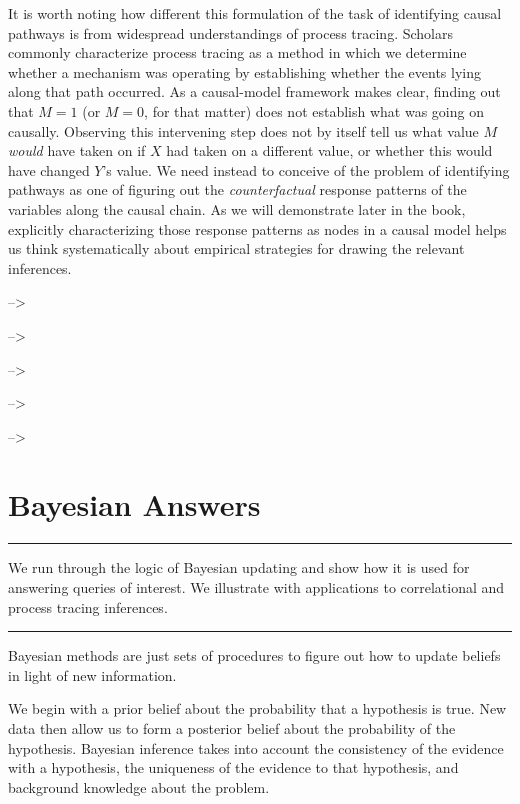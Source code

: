 \documentclass[
  12pt,
]{book}
\begin{document}
It is worth noting how different this formulation of the task of identifying causal pathways is from widespread understandings of process tracing. Scholars commonly characterize process tracing as a method in which we determine whether a mechanism was operating by establishing whether the events lying along that path occurred. As a causal-model framework makes clear, finding out that \(M=1\) (or \(M=0\), for that matter) does not establish what was going on causally. Observing this intervening step does not by itself tell us what value \(M\) \emph{would} have taken on if \(X\) had taken on a different value, or whether this would have changed \(Y\)'s value. We need instead to conceive of the problem of identifying pathways as one of figuring out the \emph{counterfactual} response patterns of the variables along the causal chain. As we will demonstrate later in the book, explicitly characterizing those response patterns as nodes in a causal model helps us think systematically about empirical strategies for drawing the relevant inferences.

--\textgreater{}

--\textgreater{}

--\textgreater{}

--\textgreater{}

--\textgreater{}

\hypertarget{bayeschapter}{%
\chapter{Bayesian Answers}\label{bayeschapter}}

\begin{center}\rule{0.5\linewidth}{0.5pt}\end{center}

We run through the logic of Bayesian updating and show how it is used for answering queries of interest. We illustrate with applications to correlational and process tracing inferences.

\begin{center}\rule{0.5\linewidth}{0.5pt}\end{center}

Bayesian methods are just sets of procedures to figure out how to update beliefs in light of new information.

We begin with a prior belief about the probability that a hypothesis is true. New data then allow us to form a posterior belief about the probability of the hypothesis. Bayesian inference takes into account the consistency of the evidence with a hypothesis, the uniqueness of the evidence to that hypothesis, and background knowledge about the problem.
\end{document}
